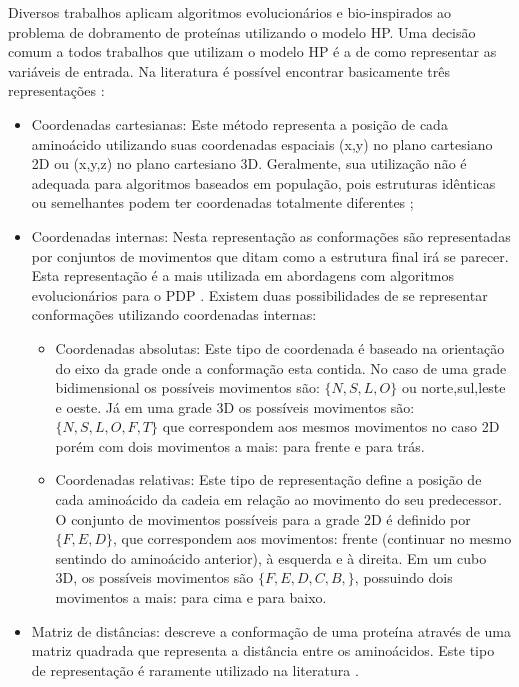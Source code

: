 

Diversos trabalhos aplicam algoritmos evolucionários e bio-inspirados ao problema de dobramento de proteínas utilizando o modelo HP. Uma decisão comum a todos trabalhos que utilizam o modelo HP é a de como representar as variáveis de entrada. Na literatura é possível encontrar basicamente três representações \cite{krasnogor1999protein, lopes2008evolutionary}: 

\begin{itemize}
	\item Coordenadas cartesianas: Este método  representa a posição de cada aminoácido utilizando suas coordenadas espaciais (x,y) no plano cartesiano 2D ou (x,y,z) no plano cartesiano 3D. Geralmente, sua utilização não é adequada para algoritmos baseados em população, pois estruturas idênticas ou semelhantes podem ter coordenadas totalmente diferentes  \cite{benitez2015algoritmo}; 
	\item Coordenadas internas: Nesta representação as conformações são representadas por conjuntos de movimentos que ditam como a estrutura final irá se parecer. Esta representação é a mais utilizada em abordagens com algoritmos evolucionários para o PDP \cite{benitez2015algoritmo}. Existem duas possibilidades de se representar conformações utilizando coordenadas internas:
	\begin{itemize}
		\item Coordenadas absolutas: Este tipo de coordenada é baseado na orientação do eixo da grade onde a conformação esta contida. No caso de uma grade bidimensional os possíveis movimentos são: $\{N,S,L,O\}$ ou norte,sul,leste e oeste. Já em uma grade 3D os possíveis movimentos são: $\{N,S,L,O,F,T\}$ que correspondem aos mesmos movimentos no caso 2D porém com dois movimentos a mais: para frente e para trás.
		\item Coordenadas relativas: Este tipo de representação define a posição de cada aminoácido da cadeia em relação ao movimento do seu predecessor. O conjunto de movimentos possíveis para a grade 2D é definido por $\{F,E,D\}$, que correspondem aos movimentos: frente (continuar no mesmo sentindo do aminoácido anterior), à esquerda e à direita. Em um cubo 3D, os possíveis movimentos são $\{F,E,D,C,B,\}$, possuindo dois movimentos a mais: para cima e para baixo. 
	\end{itemize}
	\item Matriz de distâncias: descreve a conformação de uma proteína através de uma matriz quadrada que representa a distância entre os aminoácidos. Este tipo de representação é raramente utilizado na literatura \cite{benitez2015algoritmo}.
\end{itemize}



